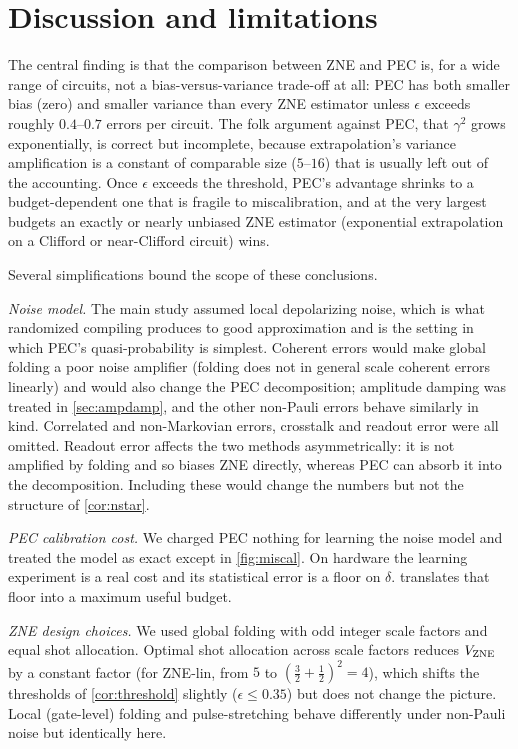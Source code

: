 \documentclass[11pt,a4paper]{article}
\theoremstyle{remark}
\newcommand{\eps}{\epsilon}
\begin{document}
\section{Discussion and limitations}
\label{sec:discussion}

The central finding is that the comparison between ZNE and PEC is, for a wide range of circuits, not a bias-versus-variance trade-off at all: PEC has both smaller bias (zero) and smaller variance than every ZNE estimator unless $\eps$ exceeds roughly $0.4$--$0.7$ errors per circuit. The folk argument against PEC, that $\gamma^2$ grows exponentially, is correct but incomplete, because extrapolation's variance amplification is a constant of comparable size ($5$--$16$) that is usually left out of the accounting. Once $\eps$ exceeds the threshold, PEC's advantage shrinks to a budget-dependent one that is fragile to miscalibration, and at the very largest budgets an exactly or nearly unbiased ZNE estimator (exponential extrapolation on a Clifford or near-Clifford circuit) wins.

Several simplifications bound the scope of these conclusions.

\emph{Noise model.} The main study assumed local depolarizing noise, which is what randomized compiling produces to good approximation \cite{wallman2016} and is the setting in which PEC's quasi-probability is simplest. Coherent errors would make global folding a poor noise amplifier (folding does not in general scale coherent errors linearly) and would also change the PEC decomposition; amplitude damping was treated in \cref{sec:ampdamp}, and the other non-Pauli errors behave similarly in kind. Correlated and non-Markovian errors, crosstalk and readout error were all omitted. Readout error affects the two methods asymmetrically: it is not amplified by folding and so biases ZNE directly, whereas PEC can absorb it into the decomposition. Including these would change the numbers but not the structure of \cref{cor:nstar}.

\emph{PEC calibration cost.} We charged PEC nothing for learning the noise model and treated the model as exact except in \cref{fig:miscal}. On hardware the learning experiment is a real cost and its statistical error is a floor on $\delta$.  translates that floor into a maximum useful budget.

\emph{ZNE design choices.} We used global folding with odd integer scale factors and equal shot allocation. Optimal shot allocation across scale factors reduces $V_{\rm ZNE}$ by a constant factor (for ZNE-lin, from $5$ to $(\tfrac32+\tfrac12)^2=4$), which shifts the thresholds of \cref{cor:threshold} slightly ($\eps\le0.35$) but does not change the picture. Local (gate-level) folding and pulse-stretching behave differently under non-Pauli noise but identically here.
\end{document}
